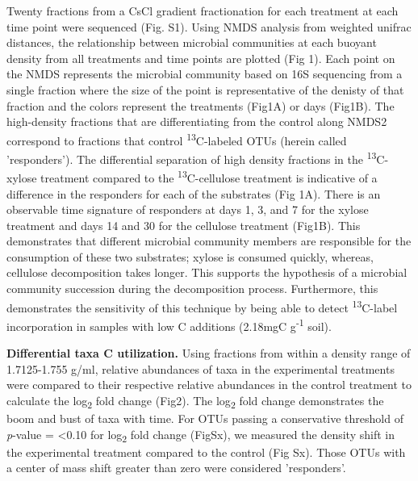 Twenty fractions from a CsCl gradient fractionation for each treatment at each time point were sequenced (Fig. S1). Using NMDS analysis from weighted unifrac distances, the relationship between microbial communities at each buoyant density from all treatments and time points are plotted (Fig 1). Each point on the NMDS represents the microbial community based on 16S sequencing from a single fraction where the size of the point is representative of the denisty of that fraction and the colors represent the treatments (Fig1A) or days (Fig1B). The high-density fractions that are differentiating from the control along NMDS2 correspond to fractions that control \textsuperscript{13}C-labeled OTUs (herein called 'responders'). The differential separation of high density fractions in the \textsuperscript{13}C-xylose treatment compared to the \textsuperscript{13}C-cellulose treatment is indicative of a difference in the responders for each of the substrates (Fig 1A). There is an observable time signature of responders at days 1, 3, and 7 for the xylose treatment and days 14 and 30 for the cellulose treatment (Fig1B). This demonstrates that different microbial community members are responsible for the consumption of these two substrates; xylose is consumed quickly, whereas, cellulose decomposition takes longer. This supports the hypothesis of a microbial community succession during the decomposition process. Furthermore, this demonstrates the sensitivity of this technique by being able to detect \textsuperscript{13}C-label incorporation in samples with low C additions (2.18mgC g\textsuperscript{-1} soil).    


\textbf{Differential taxa C utilization.} Using fractions from within a density range of 1.7125-1.755 g/ml, relative abundances of taxa in the experimental treatments were compared to their respective relative abundances in the control treatment to calculate the log\textsubscript{2} fold change (Fig2). The log\textsubscript{2} fold change demonstrates the boom and bust of taxa with time. For OTUs passing a conservative threshold of \textit{p}-value = <0.10 for log\textsubscript{2} fold change (FigSx), we measured the density shift in the experimental treatment compared to the control (Fig Sx).  Those OTUs with a center of mass shift greater than zero were considered 'responders'.   

